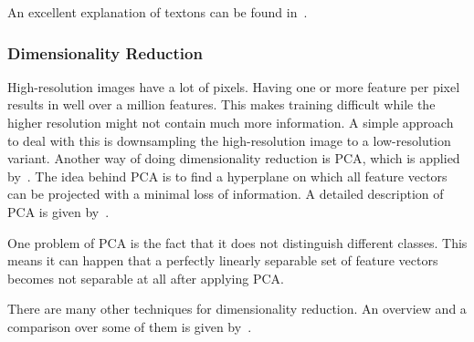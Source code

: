 An excellent explanation of textons can be found in~\cite{zhu2005textons}.


\subsubsection{Dimensionality Reduction}
High-resolution images have a lot of pixels. Having one or more feature per
pixel results in well over a million features. This makes training difficult
while the higher resolution might not contain much more information. A simple
approach to deal with this is downsampling the high-resolution image to a
low-resolution variant. Another way of doing dimensionality reduction is
\gls{PCA}, which is applied by~\cite{chen2011pixel}. The idea behind \gls{PCA}
is to find a hyperplane on which all feature vectors can be projected with a
minimal loss of information. A detailed description of \gls{PCA} is given
by~\cite{smith2002tutorial}.

One problem of \gls{PCA} is the fact that it does not distinguish different
classes. This means it can happen that a perfectly linearly separable set of
feature vectors becomes not separable at all after applying \gls{PCA}.

There are many other techniques for dimensionality reduction. An overview and
a comparison over some of them is given by~\cite{van2009dimensionality}.
